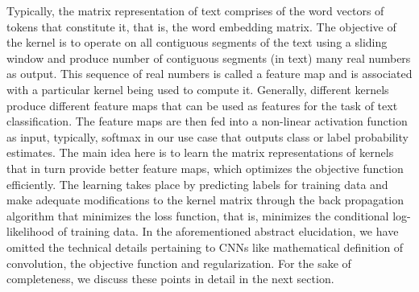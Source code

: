 Typically, the matrix representation of text comprises of the word vectors of tokens that constitute it, that is, the word embedding matrix. The objective of the kernel is to operate on all contiguous segments of the text using a sliding window and produce number of contiguous segments (in text) many real numbers as output. This sequence of real numbers is called a feature map and is associated with a particular kernel being used to compute it. Generally, different kernels produce different feature maps that can be used as features for the task of text classification. The feature maps are then fed into a non-linear activation function as input, typically, softmax in our use case that outputs class or label probability estimates. The main idea here is to learn the matrix representations of kernels that in turn provide better feature maps, which optimizes the objective function efficiently. The learning takes place by predicting labels for training data and make adequate modifications to the kernel matrix through the back propagation algorithm that minimizes the loss function, that is, minimizes the conditional log-likelihood of training data. In the aforementioned abstract elucidation, we have omitted the technical details pertaining to CNNs like mathematical definition of convolution, the objective function and regularization. For the sake of completeness, we discuss these points in detail in the next section.

